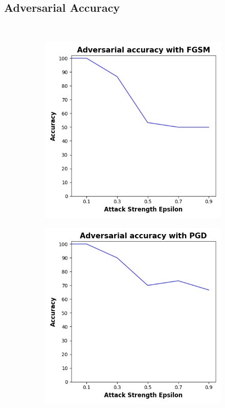 \subsection{Adversarial Accuracy}\label{subsection:iris-adv-acc} \

\begin{figure}[!h]
  \centering

  \begin{subfigure}{0.45\textwidth}
      \includegraphics[width=\linewidth]{figures/evaluation_results/iris/pqc/figures/none-fgsm.png}
      \label{fig:iris3}
  \end{subfigure} \qquad
  \begin{subfigure}{0.45\textwidth}
      \includegraphics[width=\linewidth]{figures/evaluation_results/iris/pqc/figures/none-pgd.png}

\end{subfigure}
\end{figure}
